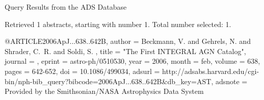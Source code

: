 Query Results from the ADS Database


Retrieved 1 abstracts, starting with number 1.  Total number selected: 1.

@ARTICLE{2006ApJ...638..642B,
   author = {{Beckmann}, V. and {Gehrels}, N. and {Shrader}, C.~R. and {Soldi}, S.
	},
    title = "{The First INTEGRAL AGN Catalog}",
  journal = {\apj},
   eprint = {astro-ph/0510530},
     year = 2006,
    month = feb,
   volume = 638,
    pages = {642-652},
      doi = {10.1086/499034},
   adsurl = {http://adsabs.harvard.edu/cgi-bin/nph-bib_query?bibcode=2006ApJ...638..642B&db_key=AST},
  adsnote = {Provided by the Smithsonian/NASA Astrophysics Data System}
}


